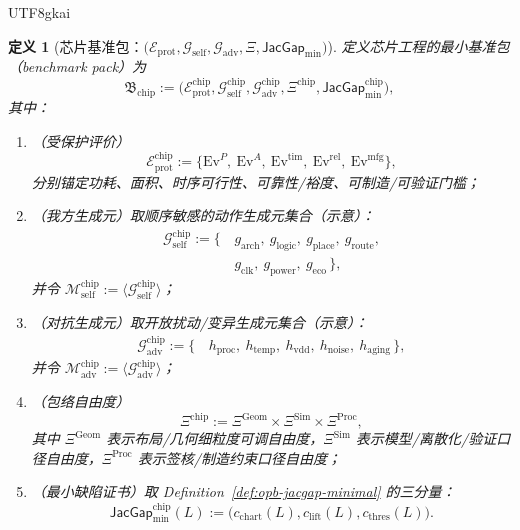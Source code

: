 \documentclass[12pt]{article}
\newtheorem{definition}{定义}[section]
\newcommand{\JacGap}{\ensuremath{\mathsf{JacGap}}}
\begin{document}
\begin{CJK*}{UTF8}{gkai}
\begin{definition}[芯片基准包：$\bigl(\mathcal{E}_{\mathrm{prot}},\mathcal{G}_{\mathrm{self}},\mathcal{G}_{\mathrm{adv}},\Xi,
  \JacGap_{\min}\bigr)$]
\label{def:chip-opb-minimal-pack}
定义芯片工程的最小基准包（benchmark pack）为
\[
\mathfrak{B}_{\mathrm{chip}}
:=
\bigl(
  \mathcal{E}_{\mathrm{prot}}^{\mathrm{chip}},
  \mathcal{G}_{\mathrm{self}}^{\mathrm{chip}},
  \mathcal{G}_{\mathrm{adv}}^{\mathrm{chip}},
  \Xi^{\mathrm{chip}},
  \JacGap_{\min}^{\mathrm{chip}}
\bigr),
\]
其中：
\begin{enumerate}
  \item（受保护评价）
  \[
  \mathcal{E}_{\mathrm{prot}}^{\mathrm{chip}}
  :=
  \bigl\{
    \mathrm{Ev}^{P},\ \mathrm{Ev}^{A},\ \mathrm{Ev}^{\mathrm{tim}},\ \mathrm{Ev}^{\mathrm{rel}},\ \mathrm{Ev}
      ^{\mathrm{mfg}}
  \bigr\},
  \]
  分别锚定功耗、面积、时序可行性、可靠性/裕度、可制造/可验证门槛；
  \item（我方生成元）取顺序敏感的动作生成元集合（示意）：
  \[
  \begin{aligned}
  \mathcal{G}_{\mathrm{self}}^{\mathrm{chip}}
  :=
  \{\, &g_{\mathrm{arch}},\ g_{\mathrm{logic}},\ g_{\mathrm{place}},\ g_{\mathrm{route}},\\
  &g_{\mathrm{clk}},\ g_{\mathrm{power}},\ g_{\mathrm{eco}}\,\},
  \end{aligned}
  \]
  并令 $\mathcal{M}_{\mathrm{self}}^{\mathrm{chip}}:=\langle \mathcal{G}_{\mathrm{self}}^{\mathrm{chip}}\rangle$；
  \item（对抗生成元）取开放扰动/变异生成元集合（示意）：
  \[
  \begin{aligned}
  \mathcal{G}_{\mathrm{adv}}^{\mathrm{chip}}
  :=
  \{\, &h_{\mathrm{proc}},\ h_{\mathrm{temp}},\ h_{\mathrm{vdd}},\ h_{\mathrm{noise}},\ h_{\mathrm{aging}}\,\},
  \end{aligned}
  \]
  并令 $\mathcal{M}_{\mathrm{adv}}^{\mathrm{chip}}:=\langle \mathcal{G}_{\mathrm{adv}}^{\mathrm{chip}}\rangle$；
  \item（包络自由度）
  \[
  \Xi^{\mathrm{chip}}:=\Xi^{\mathrm{Geom}}\times \Xi^{\mathrm{Sim}}\times \Xi^{\mathrm{Proc}},
  \]
  其中 $\Xi^{\mathrm{Geom}}$ 表示布局/几何细粒度可调自由度，$\Xi^{\mathrm{Sim}}$ 表示模型/离散化/验证口径自由度，$\Xi^{\mathrm{Proc}}$ 表示签核/制造约束口径自由度；
  \item（最小缺陷证书）取 Definition~\ref{def:opb-jacgap-minimal} 的三分量：
  \[
  \JacGap_{\min}^{\mathrm{chip}}(L)
  :=
  \bigl(c_{\mathrm{chart}}(L),c_{\mathrm{lift}}(L),c_{\mathrm{thres}}(L)\bigr).
  \]
\end{enumerate}
\end{definition}


\end{CJK*}
\end{document}
